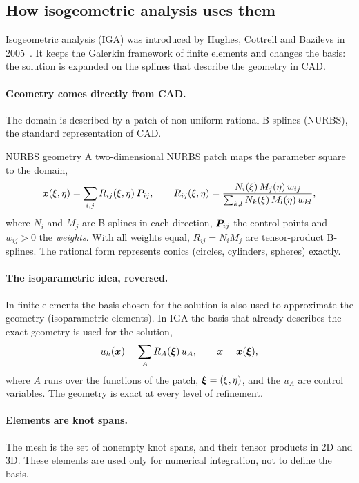 \subsection{How isogeometric analysis uses them}\label{sec:var-iga}
%
Isogeometric analysis (IGA) was introduced by Hughes, Cottrell and
Bazilevs in 2005~\cite{HughesIGA2005,CottrellIGA2009}. It keeps the Galerkin
framework of finite elements and changes the basis: the solution is
expanded on the splines that describe the geometry in CAD.

\paragraph{Geometry comes directly from CAD.}
The domain is described by a patch of non-uniform rational B-splines (NURBS),
the standard representation of CAD.
\begin{gbox}{NURBS geometry}
A two-dimensional NURBS patch maps the parameter square to the domain,
\[
  \bm{x}(\xi,\eta)=\sum_{i,j}R_{ij}(\xi,\eta)\,\bm{P}_{ij},
  \qquad
  R_{ij}(\xi,\eta)=\frac{N_i(\xi)\,M_j(\eta)\,w_{ij}}
  {\sum_{k,l}N_k(\xi)\,M_l(\eta)\,w_{kl}},
\]
where $N_i$ and $M_j$ are B-splines in each direction, $\bm{P}_{ij}$ the
control points and $w_{ij}>0$ the \emph{weights}. With all weights equal,
$R_{ij}=N_iM_j$ are tensor-product B-splines. The rational form represents
conics (circles, cylinders, spheres) exactly.
\end{gbox}

\paragraph{The isoparametric idea, reversed.}
%
In finite elements the basis chosen for the solution is also used to
approximate the geometry (isoparametric elements). In IGA the basis that
already describes the exact geometry is used for the solution,
\[
  u_h(\bm{x})=\sum_AR_A(\bm{\xi})\,u_A,\qquad \bm{x}=\bm{x}(\bm{\xi}),
\]
where $A$ runs over the functions of the patch, $\bm{\xi}=(\xi,\eta)$, and the
$u_A$ are control variables. The geometry is exact at every level of
refinement.

\paragraph{Elements are knot spans.}
The mesh is the set of nonempty knot spans, and their tensor products in 2D
and 3D. These elements are used only for numerical integration, not to
define the basis.

